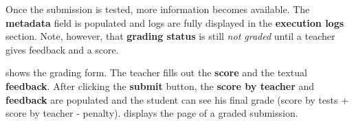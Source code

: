 
Once the submission is tested, more information becomes available. The \textbf{metadata} field is populated and logs are fully displayed in the \textbf{execution logs} section. Note, however, that \textbf{grading status} is still \textit{not graded} until a teacher gives feedback and a score.


 shows the grading form. The teacher fills out the \textbf{score} and the textual \textbf{feedback}. After clicking the \textbf{submit} button, the \textbf{score by teacher} and \textbf{feedback} are populated and the student can see his final grade (score by tests + score by teacher - penalty).  displays the page of a graded submission.

